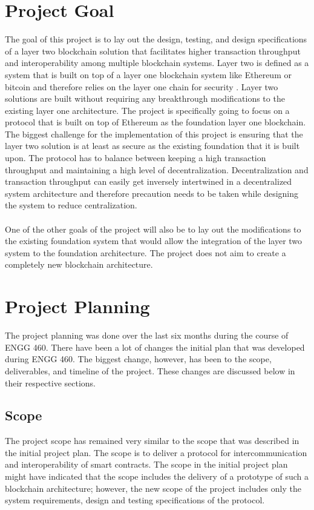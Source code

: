 \documentclass[a4paper,twoside,phd]{BYUPhys}
\begin{document}
\section{Project Goal}
The goal of this project is to lay out the design, testing, and design specifications of a layer two blockchain solution that facilitates higher transaction throughput and interoperability among multiple blockchain systems. Layer two is defined as a system that is built on top of a layer one blockchain system like Ethereum or bitcoin and therefore relies on the layer one chain for security \cite{}. Layer two solutions are built without requiring any breakthrough modifications to the existing layer one architecture. The project is specifically going to focus on a protocol that is built on top of Ethereum as the foundation layer one blockchain. The biggest challenge for the implementation of this project is ensuring that the layer two solution is at least as secure as the existing foundation that it is built upon. The protocol has to balance between keeping a high transaction throughput and maintaining a high level of decentralization. Decentralization and transaction throughput can easily get inversely intertwined in a decentralized system architecture and therefore precaution needs to be taken while designing the system to reduce centralization.
\\
\\ One of the other goals of the project will also be to lay out the modifications to the existing foundation system that would allow the integration of the layer two system to the foundation architecture. The project does not aim to create a completely new blockchain architecture.
\section{Project Planning}
The project planning was done over the last six months during the course of ENGG 460. There have been a lot of changes the initial plan that was developed during ENGG 460. The biggest change, however, has been to the scope, deliverables, and timeline of the project. These changes are discussed below in their respective sections.

\subsection{Scope}
The project scope has remained very similar to the scope that was described in the initial project plan. The scope is to deliver a protocol for intercommunication and interoperability of smart contracts. The scope in the initial project plan might have indicated that the scope includes the delivery of a prototype of such a blockchain architecture; however, the new scope of the project includes only the system requirements, design and testing specifications of the protocol. 
\end{document}
